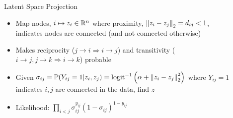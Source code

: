 \documentclass[final]{beamer}
\newlength{\sepwid}
\newlength{\onecolwid}
\newlength{\twocolwid}
\begin{document}
\begin{frame}[t]
\begin{columns}[t]
\begin{column}{\onecolwid}


\end{column} %

\begin{column}{\sepwid}\end{column} %

\begin{column}{\twocolwid} %

\begin{columns}[t,totalwidth=\twocolwid] %

\begin{column}{\onecolwid}\vspace{-.6in} %


  \begin{block}{Latent Space Projection}
    \begin{itemize}
    \item Map nodes, $i\mapsto z_i\in\mathbb{R}^n$ where proximity,
    $\left\|z_i-z_j\right\|_2=d_{ij}<1$, indicates nodes are connected (and not
    connected otherwise)
    \item Makes reciprocity ($j\rightarrow i\Rightarrow i\rightarrow j$) and
    transitivity ($i\rightarrow j, j\rightarrow k\Rightarrow
    i\rightarrow k$) probable
  \item Given $\sigma_{ij} = \mathbb{P}(Y_{ij}=1|z_i,z_j) = \textrm{logit}^{-1}\left(\alpha + \left\|z_i-z_j\right\|_2^2\right)$
    where $Y_{ij}=1$ indicates $i,j$ are connected in the data, find $z$
  \item Likelihood: $\prod_{i<j} \sigma_{ij}^{y_{ij}}(1- \sigma_{ij})^{1-y_{ij}}$
  \end{itemize}





\end{block}
\end{column}
\end{columns}
\end{column}
\end{columns}
\end{frame}
\end{document}
